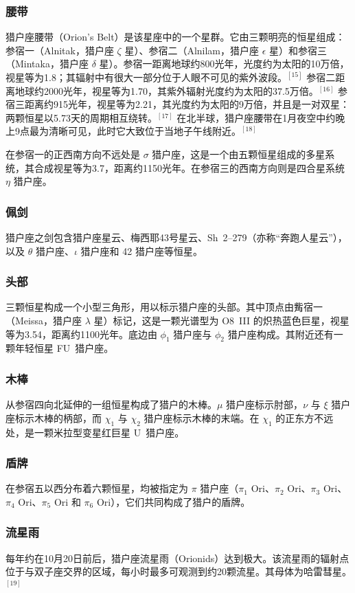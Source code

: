 \subsubsection{腰带}  
猎户座腰带（Orion's Belt）是该星座中的一个星群。它由三颗明亮的恒星组成：参宿一（Alnitak，猎户座 $\zeta$ 星）、参宿二（Alnilam，猎户座 $\epsilon$ 星）和参宿三（Mintaka，猎户座 $\delta$ 星）。参宿一距离地球约800光年，光度约为太阳的10万倍，视星等为1.8；其辐射中有很大一部分位于人眼不可见的紫外波段。$^{[15]}$ 参宿二距离地球约2000光年，视星等为1.70，其紫外辐射光度约为太阳的37.5万倍。$^{[16]}$ 参宿三距离约915光年，视星等为2.21，其光度约为太阳的9万倍，并且是一对双星：两颗恒星以5.73天的周期相互绕转。$^{[17]}$ 在北半球，猎户座腰带在1月夜空中约晚上9点最为清晰可见，此时它大致位于当地子午线附近。$^{[18]}$

在参宿一的正西南方向不远处是 $\sigma$ 猎户座，这是一个由五颗恒星组成的多星系统，其合成视星等为3.7，距离约1150光年。在参宿三的西南方向则是四合星系统 $\eta$ 猎户座。
\subsubsection{佩剑}  
猎户座之剑包含猎户座星云、梅西耶43号星云、Sh~2--279（亦称“奔跑人星云”），以及 $\theta$ 猎户座、$\iota$ 猎户座和 42 猎户座等恒星。
\subsubsection{头部}  
三颗恒星构成一个小型三角形，用以标示猎户座的头部。其中顶点由觜宿一（Meissa，猎户座 $\lambda$ 星）标记，这是一颗光谱型为 O8~III 的炽热蓝色巨星，视星等为3.54，距离约1100光年。底边由 $\phi_1$ 猎户座与 $\phi_2$ 猎户座构成。其附近还有一颗年轻恒星 FU~猎户座。
\subsubsection{木棒}  
从参宿四向北延伸的一组恒星构成了猎户的木棒。$\mu$ 猎户座标示肘部，$\nu$ 与 $\xi$ 猎户座标示木棒的柄部，而 $\chi_1$ 与 $\chi_2$ 猎户座标示木棒的末端。在 $\chi_1$ 的正东方不远处，是一颗米拉型变星红巨星 U~猎户座。
\subsubsection{盾牌} 
在参宿五以西分布着六颗恒星，均被指定为 $\pi$ 猎户座（$\pi_1$ Ori、$\pi_2$ Ori、$\pi_3$ Ori、$\pi_4$ Ori、$\pi_5$ Ori 和 $\pi_6$ Ori），它们共同构成了猎户的盾牌。
\subsubsection{流星雨}  
每年约在10月20日前后，猎户座流星雨（Orionids）达到极大。该流星雨的辐射点位于与双子座交界的区域，每小时最多可观测到约20颗流星。其母体为哈雷彗星。$^{[19]}$
